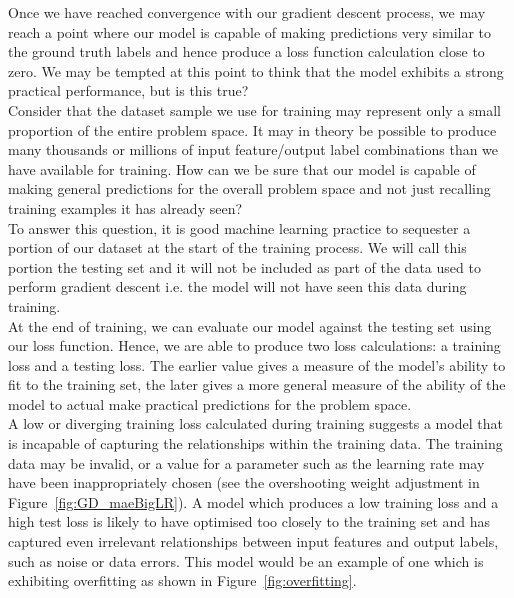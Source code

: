 \noindent
Once we have reached convergence with our gradient descent process, we may reach a point where our model is capable of making predictions very similar to the ground truth labels and hence produce a loss function calculation close to zero. We may be tempted at this point to think that the model exhibits a strong practical performance, but is this true? \\

\noindent
Consider that the dataset sample we use for training may represent only a small proportion of the entire problem space. It may in theory be possible to produce many thousands or millions of input feature/output label combinations than we have available for training. How can we be sure that our model is capable of making general predictions for the overall problem space and not just recalling training examples it has already seen? \\

\noindent
To answer this question, it is good machine learning practice to sequester a portion of our dataset at the start of the training process. We will call this portion the testing set and it will not be included as part of the data used to perform gradient descent i.e. the model will not have seen this data during training. \\

\noindent
At the end of training, we can evaluate our model against the testing set using our loss function. Hence, we are able to produce two loss calculations: a training loss and a testing loss. The earlier value gives a measure of the model's ability to fit to the training set, the later gives a more general measure of the ability of the model to actual make practical predictions for the problem space. \\

\noindent
A low or diverging training loss calculated during training suggests a model that is incapable of capturing the relationships within the training data. The training data may be invalid, or a value for a parameter such as the learning rate may have been inappropriately chosen (see the overshooting weight adjustment in Figure~\ref{fig:GD_maeBigLR}). A model which produces a low training loss and a high test loss is likely to have optimised too closely to the training set and has captured even irrelevant relationships between input features and output labels, such as noise or data errors. This model would be an example of one which is exhibiting overfitting \cite{ying2019overview} as shown in Figure~\ref{fig:overfitting}. \\

